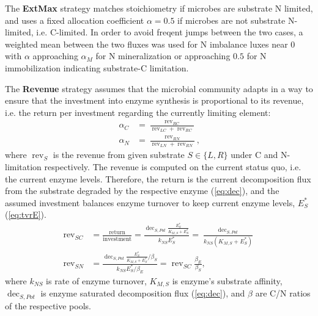 The \textbf{ExtMax} strategy matches stoichiometry if microbes are substrate N
limited, and uses a fixed allocation coefficient $\alpha = 0.5$ if microbes are
not substrate N-limited, i.e. C-limited. In order to avoid freqent jumps
between the two cases, a weighted mean between the two fluxes was used
for N imbalance luxes near 0 with $\alpha$ approaching $\alpha_M$ for N
mineralization or approaching $0.5$ for N immobilization indicating substrate-C
limitation.

The \textbf{Revenue} strategy assumes that the microbial community adapts in a
way to ensure that the investment into enzyme synthesis is proportional to its
revenue, i.e.
the return per investment regarding the currently limiting element:
\begin{subequations}
\label{eq:allocRev}
\begin{align}
\alpha_C &= \frac{\operatorname{rev}_{RC}}{\operatorname{rev}_{LC} + \operatorname{rev}_{RC}} 
\\
\alpha_N &= \frac{\operatorname{rev}_{RN}}{\operatorname{rev}_{LN} + \operatorname{rev}_{RN}} 
\text{,} 
\end{align}
\end{subequations}
where $\operatorname{rev}_S$ is the revenue from given substrate $S \in \{L,R\}$
under C and N-limitation respectively. The revenue is computed on the current
status quo, i.e. the current enzyme levels. Therefore, the return is the current
decomposition flux from the substrate degraded by the respective enzyme
(\ref{eq:dec}), and the assumed investment balances enzyme turnover to keep
current enzyme levels, $E_S^*$ (\ref{eq:tvrE}).
\begin{subequations}
\label{eq:allocRev2}
\begin{align}
\operatorname{rev}_{SC} &= \frac{\text{return}}{\text{investment}} 
= \frac{\operatorname{dec}_{S,Pot} \frac{E_S^*}{K_{M,S} + E_S^*}} {k_{NS}E_S^*} 
= \frac{\operatorname{dec}_{S,Pot}} {k_{NS}(K_{M,S} + E_S^*)} 
\\ 
\operatorname{rev}_{SN} &= \frac{\operatorname{dec}_{S,Pot}
\frac{E_S^*}{K_{M,S} + E_S^*} / \beta_S} {k_{NS} E_S^* / \beta_E} 
= \operatorname{rev}_{SC} \frac{\beta_E}{\beta_S}
\text{,} 
\end{align}
\end{subequations} 
where $k_{NS}$ is rate of enzyme turnover, $K_{M,S}$ is enzyme's substrate
affinity, $\operatorname{dec}_{S,Pot}$ is
enzyme saturated decomposition flux (\ref{eq:dec}), and $\beta$ are C/N ratios
of the respective pools. 

